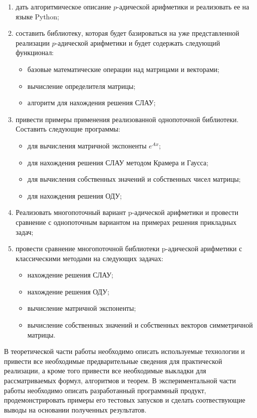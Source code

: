 \documentclass[master, och, times, assignment]{sty/SCWorks}
\begin{document}
\begin{enumerate}
	\item дать алгоритмическое описание $p$-адической арифметики и реализовать ее на языке Python;
	\item составить библиотеку, которая будет базироваться на уже представленной реализации $p$-адической арифметики и будет содержать следующий функционал:  
	\begin{itemize}
    \item базовые математические операции над матрицами и векторами;
    \item вычисление определителя матрицы;
    \item алгоритм для нахождения решения СЛАУ;
    \end{itemize}
    \item привести примеры применения реализованной однопоточной библиотеки. Составить следующие программы:
	\begin{itemize}
    \item для вычисления матричной экспоненты $e^{Ax}$;
    \item для нахождения решения СЛАУ методом Крамера и Гаусса;
    \item для вычисления собственных значений и собственных чисел \mbox{матрицы};
    \item для нахождения решения ОДУ;
    \end{itemize}
    \item Реализовать многопоточный вариант p-адической арифметики и \mbox{провести} сравнение с однопоточным \mbox{вариантом} на примерах решения прикладных задач;
    \item провести сравнение многопоточной библиотеки p-адической \mbox{арифметики} с классическими методами на следующих задачах:
    \begin{itemize}
    \item нахождение решения СЛАУ;
    \item нахождение решения ОДУ;    
 	\item вычисление матричной экспоненты;
 	\item вычисление собственных значений и собственных векторов симметричной матрицы.
    \end{itemize}
\end{enumerate}


В теоретической части работы необходимо описать используемые технологии и привести все необходимые предварительные сведения для \mbox{практической} реализации, а кроме того привести все необходимые \mbox{выкладки} для рассматриваемых формул, алгоритмов и теорем. В экспериментальной части работы необходимо описать разработанный программный продукт, продемонстрировать примеры его тестовых запусков и сделать соотвествующие выводы на основании полученных результатов.

\signatureline
	
\end{document}
